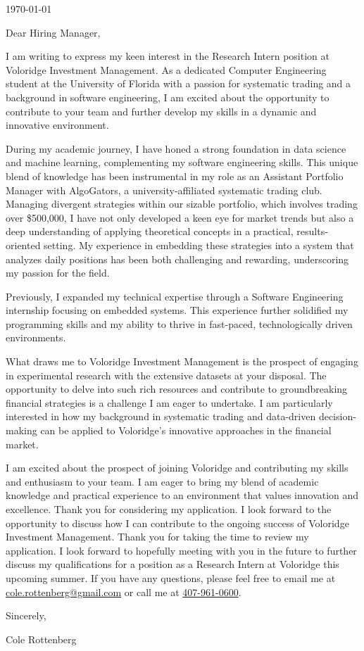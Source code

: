 \documentclass{ExpressiveCoverLetter}
\begin{document}
\coverletterheader[
    firstname=Cole,
    middleinitial=H,
    lastname=Rottenberg,
    email=cole.rottenberg@gmail.com,
    phone=407-961-0600,
    linkedin=colerottenberg,
    github=colerotteberg,
    city=Orlando,
    state=Florida,
]

\vspace{0.25in}
\today
\vspace{0.15in}

Dear Hiring Manager,

I am writing to express my keen interest in the Research Intern position at Voloridge Investment Management. As a dedicated Computer Engineering student at the University of Florida with a passion for systematic trading and a background in software engineering, I am excited about the opportunity to contribute to your team and further develop my skills in a dynamic and innovative environment.

During my academic journey, I have honed a strong foundation in data
science and machine learning, complementing my software engineering
skills.
This unique blend of knowledge has been instrumental in my role as an
Assistant Portfolio Manager with AlgoGators, a university-affiliated
systematic trading club.
Managing divergent strategies within our sizable portfolio, which
involves trading over \$500,000, I have not only developed a keen eye for
market trends but also a deep understanding of applying theoretical
concepts in a practical, results-oriented setting.
My experience in embedding these strategies into a system that analyzes daily positions has been both challenging and rewarding, underscoring my passion for the field.

Previously, I expanded my technical expertise through a Software
Engineering internship focusing on embedded systems.
This experience further solidified my programming skills and my ability to thrive in fast-paced, technologically driven environments.

What draws me to Voloridge Investment Management is the prospect of
engaging in experimental research with the extensive datasets at your
disposal.
The opportunity to delve into such rich resources and contribute to
groundbreaking financial strategies is a challenge I am eager to
undertake.
I am particularly interested in how my background in systematic trading and data-driven decision-making can be applied to Voloridge's innovative approaches in the financial market.

I am excited about the prospect of joining Voloridge and contributing my skills and enthusiasm to your team. I am eager to bring my blend of academic knowledge and practical experience to an environment that values innovation and excellence. Thank you for considering my application. I look forward to the opportunity to discuss how I can contribute to the ongoing success of Voloridge Investment Management.
Thank you for taking the time to review my application. I look forward
to hopefully meeting with you in the future to further discuss my
qualifications for a position as a Research Intern at Voloridge
this upcoming summer. If you have any questions, please feel free to
email me at \href{mailto:cole.rottenberg@gmail.com}{cole.rottenberg@gmail.com} or
call me at \href{tel:+1-407-961-0600}{407-961-0600}.

Sincerely,

\vspace{.15in}

Cole Rottenberg
\end{document}
